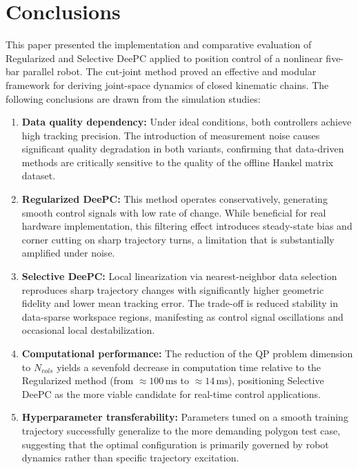 \chapter{Conclusions}
\label{ch:podsumowanie}

This paper presented the implementation and comparative evaluation of Regularized and Selective DeePC applied to position control of a nonlinear five-bar parallel robot. The cut-joint method proved an effective and modular framework for deriving joint-space dynamics of closed kinematic chains. The following conclusions are drawn from the simulation studies:

\begin{enumerate}
    \item \textbf{Data quality dependency:} Under ideal conditions, both controllers achieve high tracking precision. The introduction of measurement noise causes significant quality degradation in both variants, confirming that data-driven methods are critically sensitive to the quality of the offline Hankel matrix dataset.

    \item \textbf{Regularized DeePC:} This method operates conservatively, generating smooth control signals with low rate of change. While beneficial for real hardware implementation, this filtering effect introduces steady-state bias and corner cutting on sharp trajectory turns, a limitation that is substantially amplified under noise.

    \item \textbf{Selective DeePC:} Local linearization via nearest-neighbor data selection reproduces sharp trajectory changes with significantly higher geometric fidelity and lower mean tracking error. The trade-off is reduced stability in data-sparse workspace regions, manifesting as control signal oscillations and occasional local destabilization.

    \item \textbf{Computational performance:} The reduction of the QP problem dimension to $N_{cols}$ yields a sevenfold decrease in computation time relative to the Regularized method (from $\approx 100\,\mathrm{ms}$ to $\approx 14\,\mathrm{ms}$), positioning Selective DeePC as the more viable candidate for real-time control applications.

    \item \textbf{Hyperparameter transferability:} Parameters tuned on a smooth training trajectory successfully generalize to the more demanding polygon test case, suggesting that the optimal configuration is primarily governed by robot dynamics rather than specific trajectory excitation.
\end{enumerate}


